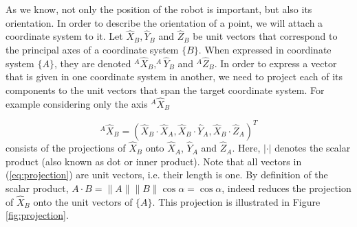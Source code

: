 As we know, not only the position of the robot is important, but also its orientation. In order to describe the orientation of a point, we will attach a coordinate system to it. Let $ \hat{X}_B, \hat{Y}_B$ and $ \hat{Z}_B$ be unit vectors that correspond to the principal axes of a coordinate system $\{B\}$. When expressed in coordinate system $\{A\}$, they are denoted $^A\hat{X}_B, ^A\hat{Y}_B$ and $ ^A\hat{Z}_B$. In order to express a vector that is given in one coordinate system in another, we need to project each of its components to the unit vectors that span the target coordinate system. For example considering only the axis $^A\hat{X}_B$

\begin{equation}\label{eq:projection}
^A\hat{X}_B=(\hat{X}_B\cdot\hat{X}_A, \hat{X}_B\cdot\hat{Y}_A,\hat{X}_B\cdot\hat{Z}_A)^T
\end{equation}
consists of the projections of $\hat{X}_B$ onto $\hat{X}_A$, $\hat{Y}_A$ and $\hat{Z}_A$. Here,  $|\cdot|$ denotes the scalar product (also known as dot or inner product).  Note that all vectors in (\ref{eq:projection}) are unit vectors, i.e. their length is one. By definition of the scalar product, $A\cdot B=\|A\|\|B\|\cos \alpha=\cos \alpha$, indeed reduces the projection of $\hat{X}_B$ onto the unit vectors of $\{A\}$. This projection is illustrated in Figure \ref{fig:projection}.


